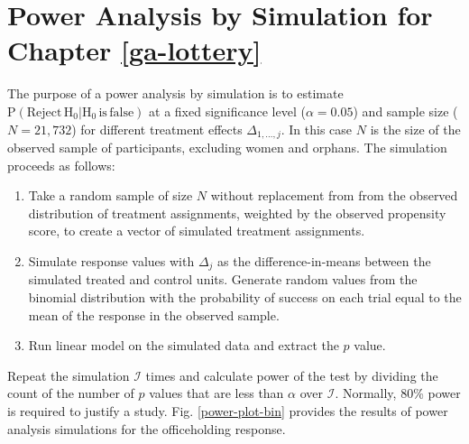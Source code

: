\chapter{Power Analysis by Simulation for Chapter \ref{ga-lottery}}\label{oa-power}

The purpose of a power analysis by simulation is to estimate $\mathrm{P}(\mathrm{Reject \, H_0} | \mathrm{H_0 \, is \, false})$ at a fixed significance level ($\alpha =0.05$) and sample size ($N=21,732$) for different treatment effects $\Delta_{1, \ldots, j}$. In this case $N$ is the size of the observed sample of participants, excluding women and orphans. The simulation proceeds as follows:

\begin{enumerate}
	\item Take a random sample of size $N$ without replacement from from the observed distribution of treatment assignments, weighted by the observed propensity score, to create a vector of simulated treatment assignments.
	\item Simulate response values with $\Delta_{j}$ as the difference-in-means between the simulated treated and control units. Generate random values from the binomial distribution with the probability of success on each trial equal to the mean of the response in the observed sample.
	\item Run linear model on the simulated data and extract the $p$ value.
\end{enumerate}

Repeat the simulation $\mathcal{I}$ times and calculate power of the test by dividing the count of the number of $p$ values that are less than $\alpha$ over $\mathcal{I}$. Normally, 80\% power is required to justify a study.  Fig. \ref{power-plot-bin} provides the results of power analysis simulations for the officeholding response. 
